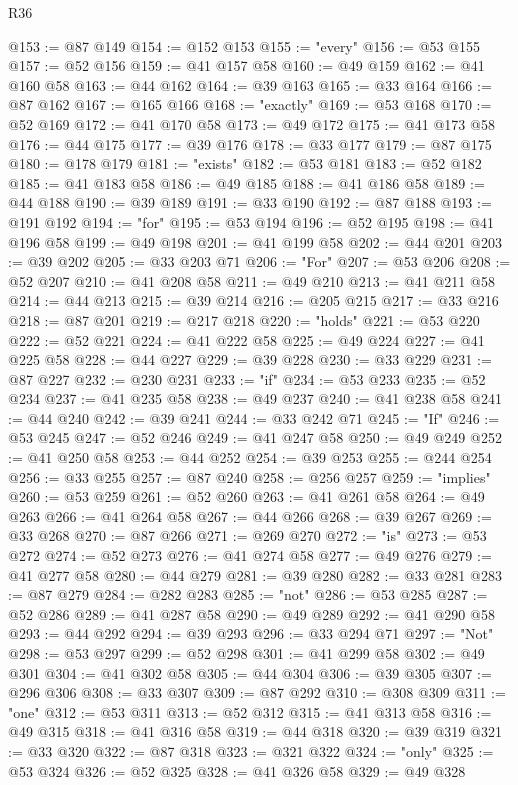 \begin{lexlean}{R36}
\begin{coremodule}
@153 := @87 @149
@154 := @152 @153
@155 := "every"
@156 := @53 @155
@157 := @52 @156
@159 := @41 @157 @58
@160 := @49 @159
@162 := @41 @160 @58
@163 := @44 @162
@164 := @39 @163
@165 := @33 @164
@166 := @87 @162
@167 := @165 @166
@168 := "exactly"
@169 := @53 @168
@170 := @52 @169
@172 := @41 @170 @58
@173 := @49 @172
@175 := @41 @173 @58
@176 := @44 @175
@177 := @39 @176
@178 := @33 @177
@179 := @87 @175
@180 := @178 @179
@181 := "exists"
@182 := @53 @181
@183 := @52 @182
@185 := @41 @183 @58
@186 := @49 @185
@188 := @41 @186 @58
@189 := @44 @188
@190 := @39 @189
@191 := @33 @190
@192 := @87 @188
@193 := @191 @192
@194 := "for"
@195 := @53 @194
@196 := @52 @195
@198 := @41 @196 @58
@199 := @49 @198
@201 := @41 @199 @58
@202 := @44 @201
@203 := @39 @202
@205 := @33 @203 @71
@206 := "For"
@207 := @53 @206
@208 := @52 @207
@210 := @41 @208 @58
@211 := @49 @210
@213 := @41 @211 @58
@214 := @44 @213
@215 := @39 @214
@216 := @205 @215
@217 := @33 @216
@218 := @87 @201
@219 := @217 @218
@220 := "holds"
@221 := @53 @220
@222 := @52 @221
@224 := @41 @222 @58
@225 := @49 @224
@227 := @41 @225 @58
@228 := @44 @227
@229 := @39 @228
@230 := @33 @229
@231 := @87 @227
@232 := @230 @231
@233 := "if"
@234 := @53 @233
@235 := @52 @234
@237 := @41 @235 @58
@238 := @49 @237
@240 := @41 @238 @58
@241 := @44 @240
@242 := @39 @241
@244 := @33 @242 @71
@245 := "If"
@246 := @53 @245
@247 := @52 @246
@249 := @41 @247 @58
@250 := @49 @249
@252 := @41 @250 @58
@253 := @44 @252
@254 := @39 @253
@255 := @244 @254
@256 := @33 @255
@257 := @87 @240
@258 := @256 @257
@259 := "implies"
@260 := @53 @259
@261 := @52 @260
@263 := @41 @261 @58
@264 := @49 @263
@266 := @41 @264 @58
@267 := @44 @266
@268 := @39 @267
@269 := @33 @268
@270 := @87 @266
@271 := @269 @270
@272 := "is"
@273 := @53 @272
@274 := @52 @273
@276 := @41 @274 @58
@277 := @49 @276
@279 := @41 @277 @58
@280 := @44 @279
@281 := @39 @280
@282 := @33 @281
@283 := @87 @279
@284 := @282 @283
@285 := "not"
@286 := @53 @285
@287 := @52 @286
@289 := @41 @287 @58
@290 := @49 @289
@292 := @41 @290 @58
@293 := @44 @292
@294 := @39 @293
@296 := @33 @294 @71
@297 := "Not"
@298 := @53 @297
@299 := @52 @298
@301 := @41 @299 @58
@302 := @49 @301
@304 := @41 @302 @58
@305 := @44 @304
@306 := @39 @305
@307 := @296 @306
@308 := @33 @307
@309 := @87 @292
@310 := @308 @309
@311 := "one"
@312 := @53 @311
@313 := @52 @312
@315 := @41 @313 @58
@316 := @49 @315
@318 := @41 @316 @58
@319 := @44 @318
@320 := @39 @319
@321 := @33 @320
@322 := @87 @318
@323 := @321 @322
@324 := "only"
@325 := @53 @324
@326 := @52 @325
@328 := @41 @326 @58
@329 := @49 @328

\end{coremodule}
\end{lexlean}
